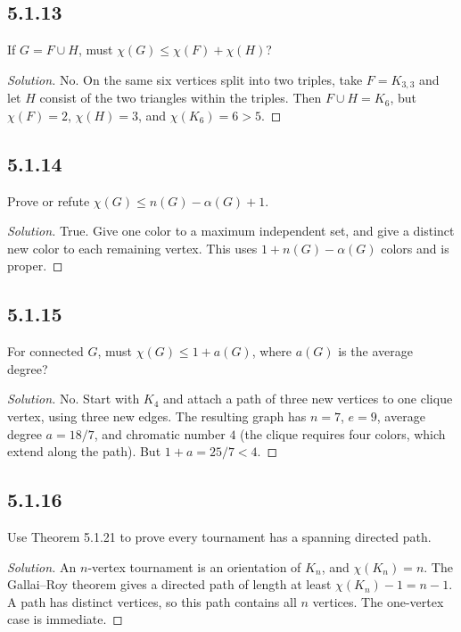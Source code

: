 \documentclass[12pt]{amsart}
\newenvironment{solution}{\begin{proof}[Solution]}{\end{proof}}
\begin{document}
    \subsection*{5.1.13} If $G=F\cup H$, must $\chi(G)\le\chi(F)+\chi(H)$?
    \begin{solution}No. On the same six vertices split into two triples, take $F=K_{3,3}$ and let $H$ consist of the two triangles within the triples. Then $F\cup H=K_6$, but $\chi(F)=2$, $\chi(H)=3$, and $\chi(K_6)=6>5$.\end{solution}

    \subsection*{5.1.14} Prove or refute $\chi(G)\le n(G)-\alpha(G)+1$.
    \begin{solution}True. Give one color to a maximum independent set, and give a distinct new color to each remaining vertex. This uses $1+n(G)-\alpha(G)$ colors and is proper.\end{solution}

    \subsection*{5.1.15} For connected $G$, must $\chi(G)\le1+a(G)$, where $a(G)$ is the average degree?
    \begin{solution}No. Start with $K_4$ and attach a path of three new vertices to one clique vertex, using three new edges. The resulting graph has $n=7$, $e=9$, average degree $a=18/7$, and chromatic number $4$ (the clique requires four colors, which extend along the path). But $1+a=25/7<4$.\end{solution}

    \subsection*{5.1.16} Use Theorem 5.1.21 to prove every tournament has a spanning directed path.
    \begin{solution}An $n$-vertex tournament is an orientation of $K_n$, and $\chi(K_n)=n$. The Gallai--Roy theorem gives a directed path of length at least $\chi(K_n)-1=n-1$. A path has distinct vertices, so this path contains all $n$ vertices. The one-vertex case is immediate.\end{solution}
\end{document}
